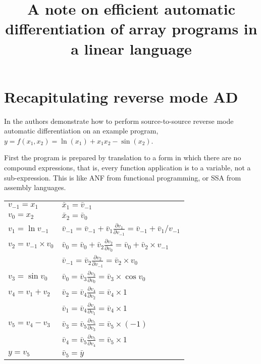 \documentclass[12pt]{article}
\title{A note on efficient automatic differentiation of array programs
  in a linear language}
\begin{document}
\maketitle

\section{Recapitulating reverse mode AD}

In \cite{adml} the authors demonstrate how to perform source-to-source
reverse mode automatic differentiation on an example program, $y =
f(x_1, x_2) = \ln(x_1)+x_1 x_2-\sin(x_2)$.

First the program is prepared by translation to a form in which there
are no compound expressions, that is, every function application is to
a variable, not a sub-expression.  This is like ANF from functional
programming, or SSA from assembly languages.

  \newcommand{\diff}[2]{
    \bar{v}_{#1} \frac{\partial v_{#1}}{\partial v_{#2}}
  }

\begin{tabular}[t]{ll}

  $v_{-1} = x_1$
  &
  $\bar{x}_1 = \bar{v}_{-1}$
  \\
  
  $v_{0} = x_2$
  &
  $\bar{x}_2 = \bar{v}_{0}$
  \\

  $v_1 = \ln{v_{-1}}$
  &
  \(\bar{v}_{-1}
  = \bar{v}_{-1} + \diff{1}{-1}
  = \bar{v}_{-1} + \bar{v}_1 / v_{-1}
  \) \\

  $v_2 = v_{-1} \times v_0$
  &
  \(\bar{v}_0
  = \bar{v}_0 + \diff{2}{0}
  = \bar{v}_0 + \bar{v}_2 \times v_{-1}
  \) \\

  &
  \(\bar{v}_{-1}
  = \diff{2}{-1}
  = \bar{v}_2 \times v_{0}
  \) \\

  $v_3 = \sin{v_0}$
  &
  \(\bar{v}_0
  = \diff{3}{0}
  = \bar{v}_3 \times \cos v_0
  \) \\

  $v_4 = v_1 + v_2$
  &
  \(\bar{v}_2
  = \diff{4}{2}
  = \bar{v}_4 \times 1
  \) \\

  &
  \(\bar{v}_1
  = \diff{4}{1}
  = \bar{v}_4 \times 1
  \) \\

  $v_5 = v_4 - v_3$
  &
  \(\bar{v}_3
  = \diff{5}{3}
  = \bar{v}_5 \times (-1)
  \) \\
  
  &
  \(\bar{v}_4
  = \diff{5}{4}
  = \bar{v}_5 \times 1
  \) \\
  
  $y = v_5$
  &
  $\bar{v}_5 = \bar{y}$
  \\

\end{tabular}
\end{document}
